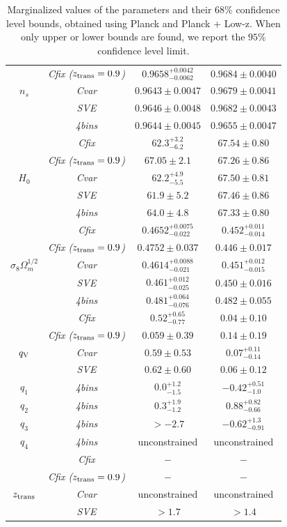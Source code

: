 \documentclass[a4paper,fleqn,usenatbib]{mnras}
\begin{document}
\begin{table}
\begin{tabular}{|c|c|c|c|}
 & \textit{Cfix ($z_{\rm trans} = 0.9$)} & $0.9658^{+0.0042}_{-0.0062}$ & $0.9684\pm 0.0040$\\
$n_s$ & \textit{Cvar} & $0.9643\pm 0.0047$ & $0.9679\pm 0.0041$  \\
 & \textit{SVE} & $0.9646\pm 0.0048$ & $0.9682\pm 0.0043$  \\
 & \textit{4bins} & $0.9644\pm 0.0045$ & $0.9655\pm 0.0047$  \\
\hline
 & \textit{Cfix} & $62.3^{+3.2}_{-6.2}$ & $67.54\pm 0.80$  \\
 & \textit{Cfix ($z_{\rm trans} = 0.9$)} & $67.05 \pm 2.1$ & $67.26 \pm 0.86$\\
$H_0$ & \textit{Cvar} & $62.2^{+4.9}_{-5.5}$ & $67.50\pm 0.81$  \\
 & \textit{SVE} & $61.9\pm 5.2$ & $67.46\pm 0.86$  \\
 & \textit{4bins} & $64.0\pm 4.8$ & $67.33\pm 0.80$  \\
\hline
&  \textit{Cfix} & $0.4652^{+0.0075}_{-0.022}$ & $0.452^{+0.011}_{-0.014}$  \\
& \textit{Cfix ($z_{\rm trans} = 0.9$)} & $0.4752 \pm 0.037$& $0.446 \pm 0.017$\\
 $\sigma_8\Omega_m^{1/2}$  &  \textit{Cvar} & $0.4614^{+0.0088}_{-0.021}$ & $0.451^{+0.012}_{-0.015}$ \\
& \textit{SVE} & $0.461^{+0.012}_{-0.025}$ & $0.450\pm 0.016$  \\
& \textit{4bins} & $0.481^{+0.064}_{-0.076}$ & $0.482\pm 0.055$  \\
\hline
 &  \textit{Cfix} & $0.52^{+0.65}_{-0.77}$ & $0.04\pm 0.10$  \\
 & \textit{Cfix ($z_{\rm trans} = 0.9$)} & $0.059 \pm 0.39$&  $0.14 \pm 0.19$\\
$q_{\rm V}$ &  \textit{Cvar} & $0.59\pm 0.53$ & $0.07^{+0.11}_{-0.14}$ \\
& \textit{SVE} & $0.62\pm 0.60$ & $0.06\pm 0.12$  \\
\hline
$ q_{1}$  & \textit{4bins} & $0.0^{+1.2}_{-1.5}$ & $-0.42^{+0.51}_{-1.0}$  \\
$ q_{2}$  & \textit{4bins} & $0.3^{+1.9}_{-1.2}$ & $0.88^{+0.82}_{-0.66}$  \\
$ q_{3}$  & \textit{4bins} & $>-2.7$ & $-0.62^{+1.3}_{-0.91}$  \\
$ q_{4}$  & \textit{4bins} & unconstrained & unconstrained  \\
\hline
 &  \textit{Cfix} & $-$ & $-$  \\
 & \textit{Cfix ($z_{\rm trans} = 0.9$)} & $-$&  $-$\\
$z_{\rm trans}$ &  \textit{Cvar} & unconstrained & unconstrained \\
& \textit{SVE} & $>1.7$ & $>1.4$  \\
\hline
\hline
\end{tabular}
\caption{Marginalized values of the parameters and their $68\%$ confidence level bounds, obtained using Planck and Planck + Low-z. When only upper or lower bounds are found, we report the $95\%$ confidence level limit.}\label{tab:constres}
\end{table}
\end{document}
